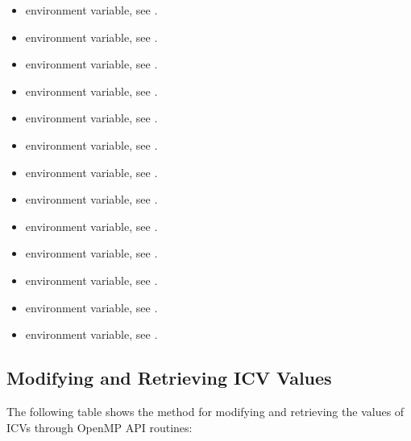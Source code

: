 \crossreferences
\begin{itemize}
\item {} environment variable, see .

\item {} environment variable, see .

\item {} environment variable, see .

\item {} environment variable, see .

\item {} environment variable, see .

\item {} environment variable, see .

\item {} environment variable, see . 

\item {} environment variable, see . 

\item {} environment variable, see .

\item {} environment variable, see .

\item {} environment variable, see .

\item {} environment variable, see .

\item {} environment variable, see .
\end{itemize}








\subsection{Modifying and Retrieving ICV Values}
\label{subsec:Modifying and Retrieving ICV Values}
The following table shows the method for modifying and retrieving the values of ICVs 
through OpenMP API routines:

